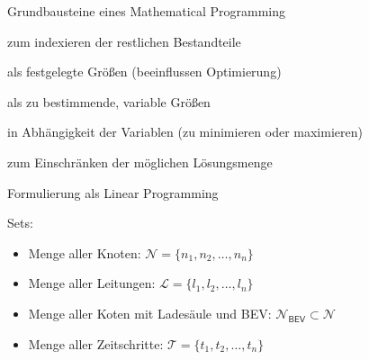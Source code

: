 \documentclass[aspectratio=169]{beamer}
\begin{document}
\begin{frame}{Grundbausteine eines Mathematical Programming}
	\begin{description}[Restriktionen]
		\item[Sets] zum indexieren der restlichen Bestandteile
		\item[Parameter] als festgelegte Größen (beeinflussen Optimierung)
		\item[Variablen] als zu bestimmende, variable Größen
		\item[Zielfunktion] in Abhängigkeit der Variablen (zu minimieren oder
		maximieren)
		\item[Restriktionen] zum Einschränken der möglichen Lösungsmenge
	\end{description}
	
\end{frame}


\begin{frame}{Formulierung als Linear Programming}
	\begin{Large}
		Sets:
	\end{Large}
	\begin{itemize}
		\item Menge aller Knoten: $\mathcal{N}=\{n_1, n_2,\dots,n_n\}$
		\item Menge aller Leitungen: $\mathcal{L}=\{l_1,l_2,\dots,l_n\}$
		\item Menge aller Koten mit Ladesäule und BEV:
		$\mathcal{N}_\mathsf{BEV}\subset\mathcal{N}$
		\item Menge aller Zeitschritte: $\mathcal{T}=\{t_1,t_2,\dots,t_n\}$
	\end{itemize}
\end{frame}
\end{document}

